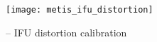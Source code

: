 \begin{figure}[hb]
  \centering
  \texttt{[image: metis\_ifu\_distortion]}
  \caption[Recipe: ]{%
    \hyperref[rec:metis_ifu_distortion]{} -- IFU distortion calibration}
  \label{fig:metis_ifu_distortion}
\end{figure}


\clearpage




